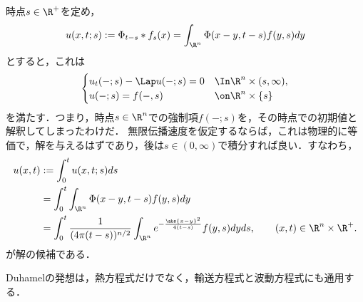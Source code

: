 \documentclass[uplatex,dvipdfmx]{jsreport}
\begin{document}
\begin{observation}[Duhamelの発想]
    時点$s\in\R^+$を定め，
    \[u(x,t;s):=\Phi_{t-s}*f_s(x)=\int_{\R^n}\Phi(x-y,t-s)f(y,s)dy\]
    とすると，これは
    \[\begin{cases}
        u_t(-;s)-\Lap u(-;s)=0&\In\R^n\times(s,\infty),\\
        u(-;s)=f(-,s)&\on\R^n\times\{s\}
    \end{cases}\]
    を満たす．つまり，時点$s\in\R^n$での強制項$f(-;s)$を，その時点での初期値と解釈してしまったわけだ．
    無限伝播速度を仮定するならば，これは物理的に等価で，解を与えるはずであり，後は$s\in(0,\infty)$で積分すれば良い．すなわち，
    \begin{align*}
        u(x,t)&:=\int^t_0u(x,t;s)ds\\
        &=\int^t_0\int_{\R^n}\Phi(x-y,t-s)f(y,s)dy\\
        &=\int^t_0\frac{1}{(4\pi (t-s))^{n/2}}\int_{\R^n}e^{-\frac{\abs{x-y}^2}{4(t-s)}}f(y,s)dyds,\qquad(x,t)\in\R^n\times\R^+.
    \end{align*}
    が解の候補である．
\end{observation}
\begin{remark}
    Duhamelの発想は，熱方程式だけでなく，輸送方程式と波動方程式にも通用する．
\end{remark}
\end{document}
